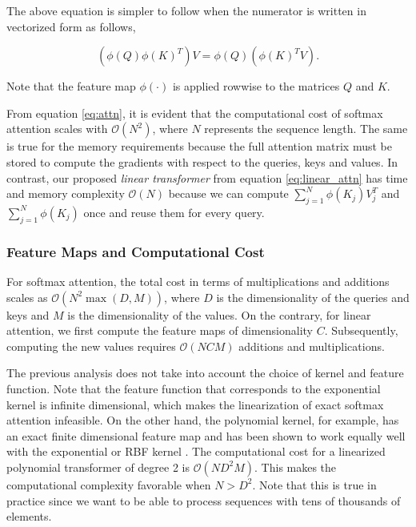 The above equation is simpler to follow when the numerator is written in vectorized form as follows,

\begin{equation}
    \left(\phi\left(Q\right) \phi\left(K\right)^T\right) V = \phi\left(Q\right) \left(\phi\left(K\right)^T V\right).
\end{equation}

Note that the feature map $\phi\left(\cdot\right)$ is applied rowwise to the matrices $Q$ and $K$.

From equation \ref{eq:attn}, it is evident that the computational cost of softmax attention scales with $\mathcal{O}\left(N^2\right)$, where $N$ represents the sequence length. The same is true for the memory requirements because the full attention matrix must be stored to compute the gradients with respect to the queries, keys and values. In contrast, our proposed \emph{linear transformer} from equation \ref{eq:linear_attn} has time and memory complexity $\mathcal{O}\left(N\right)$ because we can compute $\sum_{j=1}^N
\phi\left(K_j\right) V_j^T$ and $\sum_{j=1}^N \phi\left(K_j\right)$ once and reuse them for every query.

\subsubsection{Feature Maps and Computational Cost} \label{sec:fmap}

For softmax attention, the total cost in terms of multiplications and additions scales as $\mathcal{O}\left(N^2 \max\left(D, M\right)\right)$, where $D$ is the dimensionality of the queries and keys and $M$ is the dimensionality of the values. On the contrary, for linear attention, we first compute the feature maps of dimensionality $C$. Subsequently, computing the new values requires
$\mathcal{O}\left(N C M\right)$ additions and multiplications.

The previous analysis does not take into account the choice of kernel and feature function. Note that the feature function that corresponds to the exponential kernel is infinite dimensional, which makes the linearization of exact softmax attention infeasible. On the other hand, the polynomial kernel, for example, has an exact finite dimensional feature map and has been shown to work equally well with the exponential or RBF kernel \cite{tsai2019transformer}. The computational cost for a linearized polynomial transformer of degree 2 is $\mathcal{O}\left(N D^2 M\right)$. This makes the computational complexity favorable when $N > D^2$. Note that this is true in practice since we want to be able to process sequences with tens of thousands of elements.

